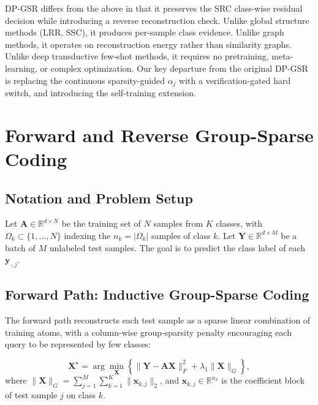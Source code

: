 \documentclass[10pt,comsoc]{IEEEtran}
\newcommand{\reals}{\mathbb{R}}
\begin{document}
DP-GSR differs from the above in that it preserves the SRC class-wise residual decision while introducing a reverse reconstruction check. Unlike global structure methods (LRR, SSC), it produces per-sample class evidence. Unlike graph methods, it operates on reconstruction energy rather than similarity graphs. Unlike deep transductive few-shot methods, it requires no pretraining, meta-learning, or complex optimization. Our key departure from the original DP-GSR \cite{wang2024dual} is replacing the continuous sparsity-guided $\alpha_j$ with a verification-gated hard switch, and introducing the self-training extension.

\section{Forward and Reverse Group-Sparse Coding}

\subsection{Notation and Problem Setup}

Let $\mathbf{A} \in \reals^{d \times N}$ be the training set of $N$ samples from $K$ classes, with $\Omega_k \subset \{1,\dots,N\}$ indexing the $n_k = |\Omega_k|$ samples of class $k$. Let $\mathbf{Y} \in \reals^{d \times M}$ be a batch of $M$ unlabeled test samples. The goal is to predict the class label of each $\mathbf{y}_{\cdot,j}$.

\subsection{Forward Path: Inductive Group-Sparse Coding}

The forward path reconstructs each test sample as a sparse linear combination of training atoms, with a column-wise group-sparsity penalty encouraging each query to be represented by few classes:

\begin{equation}
\label{eq:fw_opt}
\mathbf{X}^\star = \arg\min_{\mathbf{X}} \left\{ \|\mathbf{Y} - \mathbf{AX}\|_F^2 + \lambda_1 \|\mathbf{X}\|_G \right\},
\end{equation}
where $\|\mathbf{X}\|_G = \sum_{j=1}^M \sum_{k=1}^K \|\mathbf{x}_{k,j}\|_2$, and $\mathbf{x}_{k,j} \in \reals^{n_k}$ is the coefficient block of test sample $j$ on class $k$.
\end{document}
